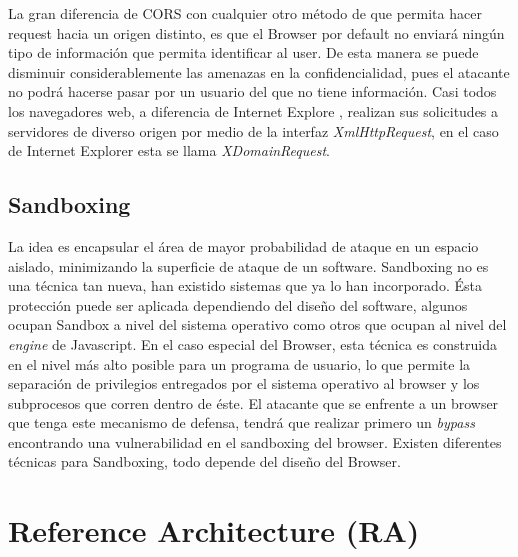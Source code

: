         La gran diferencia de CORS con cualquier otro método de que permita hacer request hacia un origen distinto, es que el Browser por default no enviará ningún tipo de información que permita identificar al user. De esta manera se puede disminuir considerablemente las amenazas en la confidencialidad, pues el atacante no podrá hacerse pasar por un usuario del que no tiene información. Casi todos los navegadores web, a diferencia de Internet Explore \cite{bookWebAppSec}, realizan sus solicitudes a servidores de diverso origen por medio de la interfaz \textit{XmlHttpRequest}, en el caso de Internet Explorer esta se llama \textit{XDomainRequest}.


    \subsection{Sandboxing}
    \label{chap2:Sandboxing}
    La idea es encapsular el área de mayor probabilidad de ataque en un espacio aislado, minimizando la superficie de ataque de un software. Sandboxing no es una técnica tan nueva, han existido sistemas que ya lo han incorporado. Ésta protección puede ser aplicada dependiendo del diseño del software, algunos ocupan Sandbox a nivel del sistema operativo como otros que ocupan al nivel del \textit{engine} de Javascript. En el caso especial del Browser, esta técnica es construida en el nivel más alto posible para un programa de usuario, lo que permite la separación de privilegios entregados por el sistema operativo al browser y los subprocesos que corren dentro de éste. El atacante que se enfrente a un browser que tenga este mecanismo de defensa, tendrá que realizar primero un \textit{bypass} encontrando una vulnerabilidad en el sandboxing del browser. Existen diferentes técnicas para Sandboxing, todo depende del diseño del Browser.




\section{Reference Architecture (RA)}
\label{chap2:ArqRef}

